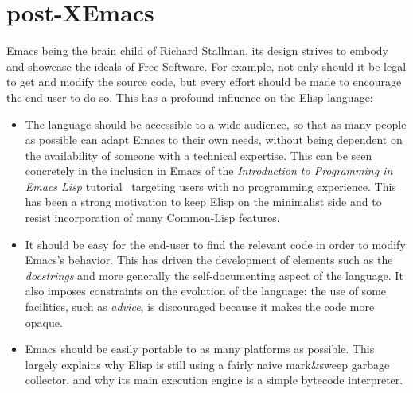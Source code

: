 \documentclass[format=acmsmall, review=false, screen=true]{acmart}
\newcommand \Elisp {Elisp}
\begin{document}

\section{post-XEmacs}           %


Emacs being the brain child of Richard Stallman, its design strives to
embody and showcase the ideals of Free Software.  For example, not only
should it be legal to get and modify the source code, but every effort
should be made to encourage the end-user to do so.  This has a profound
influence on the \Elisp{} language:
\begin{itemize}
\item The language should be accessible to a wide audience, so that as many
  people as possible can adapt Emacs to their own needs, without being
  dependent on the availability of someone with a technical expertise.
  This can be seen concretely in the inclusion in Emacs of the
  \emph{Introduction to Programming in Emacs Lisp}
  tutorial~\citep{ElispIntro} targeting users with no programming
  experience.  This has been a strong motivation to keep \Elisp{} on the
  minimalist side and to resist incorporation of many Common-Lisp features.
\item It should be easy for the end-user to find the relevant code in order
  to modify Emacs's behavior.   This has driven the development of elements
  such as the \emph{docstrings} and more generally the self-documenting
  aspect of the language.  It also imposes constraints on the evolution of
  the language: the use of some facilities, such as \emph{advice}, is
  discouraged because it makes the code more opaque.
\item Emacs should be easily portable to as many platforms as possible.
  This largely explains why \Elisp{} is still using a fairly naive
  mark\&sweep garbage collector, and why its main execution engine is
  a simple bytecode interpreter.
\end{itemize}

\end{document}
